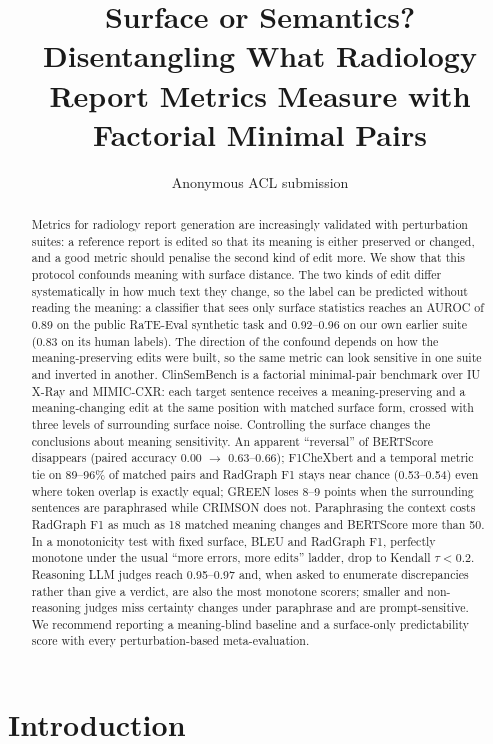 \documentclass[11pt]{article}
\title{Surface or Semantics? Disentangling What Radiology Report Metrics Measure with Factorial Minimal Pairs}
\author{Anonymous ACL submission}
\newcommand{\bench}{ClinSemBench\xspace}
\begin{document}
\maketitle

\begin{abstract}
Metrics for radiology report generation are increasingly validated with perturbation suites: a reference report is edited so that its meaning is either preserved or changed, and a good metric should penalise the second kind of edit more.
We show that this protocol confounds meaning with surface distance.
The two kinds of edit differ systematically in how much text they change, so the label can be predicted without reading the meaning: a classifier that sees only surface statistics reaches an AUROC of 0.89 on the public RaTE-Eval synthetic task and 0.92--0.96 on our own earlier suite (0.83 on its human labels).
The direction of the confound depends on how the meaning-preserving edits were built, so the same metric can look sensitive in one suite and inverted in another.
\bench is a factorial minimal-pair benchmark over IU X-Ray and MIMIC-CXR: each target sentence receives a meaning-preserving and a meaning-changing edit at the same position with matched surface form, crossed with three levels of surrounding surface noise.
Controlling the surface changes the conclusions about meaning sensitivity.
An apparent ``reversal'' of BERTScore disappears (paired accuracy 0.00 $\rightarrow$ 0.63--0.66); F1CheXbert and a temporal metric tie on 89--96\% of matched pairs and RadGraph F1 stays near chance (0.53--0.54) even where token overlap is exactly equal; GREEN loses 8--9 points when the surrounding sentences are paraphrased while CRIMSON does not.
Paraphrasing the context costs RadGraph F1 as much as 18 matched meaning changes and BERTScore more than 50.
In a monotonicity test with fixed surface, BLEU and RadGraph F1, perfectly monotone under the usual ``more errors, more edits'' ladder, drop to Kendall $\tau<0.2$.
Reasoning LLM judges reach 0.95--0.97 and, when asked to enumerate discrepancies rather than give a verdict, are also the most monotone scorers; smaller and non-reasoning judges miss certainty changes under paraphrase and are prompt-sensitive.
We recommend reporting a meaning-blind baseline and a surface-only predictability score with every perturbation-based meta-evaluation.
\end{abstract}

\section{Introduction}
\end{document}
